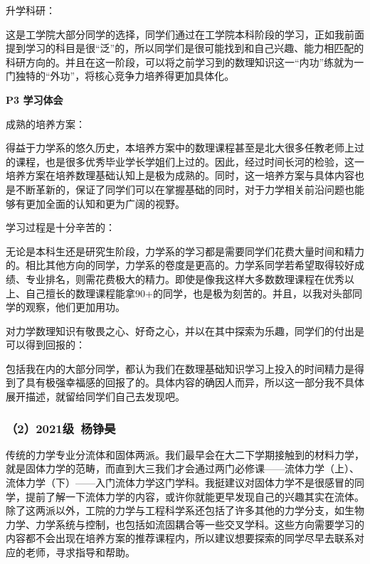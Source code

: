 \vspace{10pt}

升学科研：

这是工学院大部分同学的选择，同学们通过在工学院本科阶段的学习，正如我前面提到学习的科目是很“泛”的，所以同学们是很可能找到和自己兴趣、能力相匹配的科研方向的。并且在这一阶段，可以将之前学习到的数理知识这一“内功”练就为一门独特的“外功”，将核心竞争力培养得更加具体化。

\vspace{10pt}

\textbf{P3 学习体会}

成熟的培养方案：

得益于力学系的悠久历史，本培养方案中的数理课程甚至是北大很多任教老师上过的课程，也是很多优秀毕业学长学姐们上过的。因此，经过时间长河的检验，这一培养方案在培养数理基础认知上是极为成熟的。同时，这一培养方案与具体内容也是不断革新的，保证了同学们可以在掌握基础的同时，对于力学相关前沿问题也能够有更加全面的认知和更为广阔的视野。

\vspace{10pt}

学习过程是十分辛苦的：

无论是本科生还是研究生阶段，力学系的学习都是需要同学们花费大量时间和精力的。相比其他方向的同学，力学系的卷度是更高的。力学系同学若希望取得较好成绩、专业排名，则需花费极大的精力。即使是像我这样大多数数理课程在优秀以上、自己擅长的数理课程能拿90+的同学，也是极为刻苦的。并且，以我对头部同学的观察，他们更加用功。

\vspace{10pt}

对力学数理知识有敬畏之心、好奇之心，并以在其中探索为乐趣，同学们的付出是可以得到回报的：

包括我在内的大部分同学，都认为我们在数理基础知识学习上投入的时间精力是得到了具有极强幸福感的回报了的。具体内容的确因人而异，所以这一部分我不具体展开描述，就留给同学们自己去发现吧。

\subsubsection{（2）2021级\ 杨铮昊}

传统的力学专业分流体和固体两派。我们最早会在大二下学期接触到的材料力学，就是固体力学的范畴，而直到大三我们才会通过两门必修课——流体力学（上）、流体力学（下）——入门流体力学这门学科。我挺建议对固体力学不是很感冒的同学，提前了解一下流体力学的内容，或许你就能更早发现自己的兴趣其实在流体。除了这两派以外，工院的力学与工程科学系还包括了许多其他的力学分支，如生物力学、力学系统与控制，也包括如流固耦合等一些交叉学科。这些方向需要学习的内容都不会出现在培养方案的推荐课程内，所以建议想要探索的同学尽早去联系对应的老师，寻求指导和帮助。

